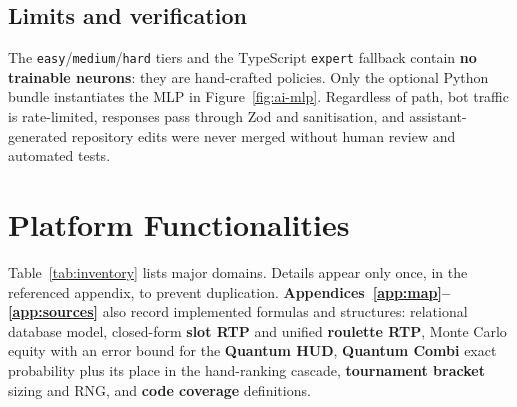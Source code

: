 \documentclass[11pt,a4paper]{article}
\begin{document}
\subsection{Limits and verification}

The \texttt{easy}/\texttt{medium}/\texttt{hard} tiers and the TypeScript \texttt{expert} fallback contain \textbf{no trainable neurons}: they are hand-crafted policies. Only the optional Python bundle instantiates the MLP in Figure~\ref{fig:ai-mlp}. Regardless of path, bot traffic is rate-limited, responses pass through Zod and sanitisation, and assistant-generated repository edits were never merged without human review and automated tests.

\section{Platform Functionalities}
\label{sec:functionalities}

Table~\ref{tab:inventory} lists major domains. Details appear only once, in the referenced appendix, to prevent duplication. \textbf{Appendices~\ref{app:map}--\ref{app:sources}} also record implemented formulas and structures: relational database model, closed-form \textbf{slot RTP} and unified \textbf{roulette RTP}, Monte Carlo equity with an error bound for the \textbf{Quantum HUD}, \textbf{Quantum Combi} exact probability plus its place in the hand-ranking cascade, \textbf{tournament bracket} sizing and RNG, and \textbf{code coverage} definitions.
\end{document}

